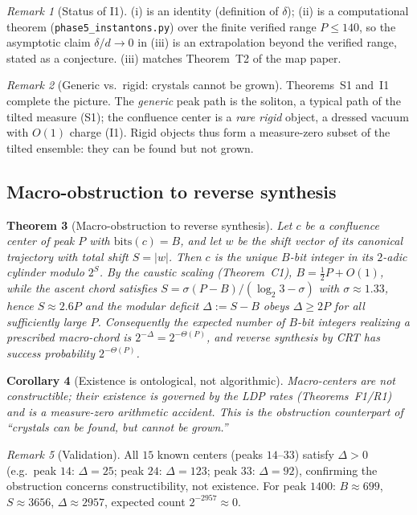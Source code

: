 \documentclass[12pt,a4paper]{article}
\newtheorem{theorem}{Theorem}[section]
\newtheorem{corollary}[theorem]{Corollary}
\theoremstyle{remark}
\newtheorem{remark}[theorem]{Remark}
\begin{document}
\begin{remark}[Status of I1]
(i) is an identity (definition of $\delta$); (ii) is a computational theorem
(\texttt{phase5\_instantons.py}) over the finite verified range $P\le140$, so the
asymptotic claim $\delta/d\to0$ in (iii) is an extrapolation beyond the verified
range, stated as a conjecture. (iii) matches Theorem~T2 of the map paper.
\end{remark}
\begin{remark}[Generic vs.\ rigid: crystals cannot be grown]
Theorems~S1 and~I1 complete the picture. The \emph{generic} peak path is the
soliton, a typical path of the tilted measure (S1); the confluence center is a
\emph{rare rigid} object, a dressed vacuum with $O(1)$ charge (I1). Rigid objects
thus form a measure-zero subset of the tilted ensemble: they can be found but not
grown.
\end{remark}
\subsection{Macro-obstruction to reverse synthesis}
\begin{theorem}[Macro-obstruction to reverse synthesis]
\label{thm:macro_obstruction}
Let $c$ be a confluence center of peak $P$ with $\mathrm{bits}(c)=B$, and let $w$
be the shift vector of its canonical trajectory with total shift $S=|w|$.
Then $c$ is the unique $B$-bit integer in its $2$-adic cylinder modulo $2^{S}$.
By the caustic scaling (Theorem~C1), $B=\tfrac12 P+O(1)$, while the ascent chord
satisfies $S=\sigma(P-B)/(\log_2 3-\sigma)$ with $\sigma\approx1.33$, hence
$S\approx2.6P$ and the modular deficit $\Delta:=S-B$ obeys $\Delta\ge2P$ for all
sufficiently large $P$. Consequently the expected number of $B$-bit integers
realizing a prescribed macro-chord is $2^{-\Delta}=2^{-\Theta(P)}$, and reverse
synthesis by CRT has success probability $2^{-\Theta(P)}$.
\end{theorem}
\begin{corollary}[Existence is ontological, not algorithmic]
Macro-centers are not constructible; their existence is governed by the LDP
rates (Theorems~F1/R1) and is a measure-zero arithmetic accident. This is the
obstruction counterpart of ``crystals can be found, but cannot be grown.''
\end{corollary}
\begin{remark}[Validation]
All $15$ known centers (peaks $14$--$33$) satisfy $\Delta>0$
(e.g.\ peak $14$: $\Delta=25$; peak $24$: $\Delta=123$; peak $33$: $\Delta=92$),
confirming the obstruction concerns constructibility, not existence.
For peak $1400$: $B\approx699$, $S\approx3656$, $\Delta\approx2957$, expected count
$2^{-2957}\approx0$.
\end{remark}
\end{document}
